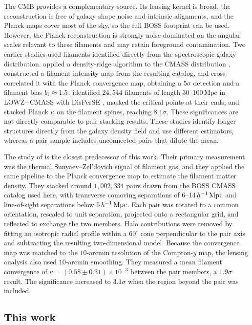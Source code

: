 The CMB provides a complementary source. Its lensing kernel is broad, the
reconstruction is free of galaxy shape noise and intrinsic alignments, and
the Planck maps cover most of the sky, so the full BOSS footprint can be
used. However, the Planck reconstruction is strongly noise dominated on the
angular scales relevant to these filaments \citep{Planck2018lensing} and may
retain foreground contamination. Two earlier studies used filaments
identified directly from the spectroscopic galaxy distribution.
\citet{He2018} applied a density-ridge algorithm to the CMASS
distribution \citep{Chen2016}, constructed a filament intensity map from the
resulting catalog, and cross-correlated it with the Planck convergence map,
obtaining a $5\sigma$ detection and a filament bias $b_{\rm f}\approx1.5$.
\citet{Tanimura2020} identified $24{,}544$ filaments of length
$30$--$100\,\mathrm{Mpc}$ in LOWZ+CMASS with DisPerSE \citep{Sousbie2011},
masked the critical points at their ends, and stacked Planck $\kappa$ on the
filament spines, reaching $8.1\sigma$. These significances are not directly
comparable to pair-stacking results. These studies identify longer structures
directly from the galaxy density field and use different estimators, whereas
a pair sample includes unconnected pairs that dilute the mean.

The study of \citet{deGraaff2019} is the closest predecessor of this work.
Their primary measurement was the thermal Sunyaev--Zel'dovich signal of
filament gas, and they applied the same pipeline to the Planck convergence
map to estimate the filament matter density. They stacked around
$1{,}002{,}334$ pairs
drawn from the BOSS CMASS catalog used here, with transverse comoving
separations of $6$--$14\,h^{-1}\,{\rm Mpc}$ and line-of-sight separations below
$5\,h^{-1}\,{\rm Mpc}$. Each pair was rotated to a common orientation, rescaled to unit
separation, projected onto a rectangular grid, and reflected to exchange the
two members. Halo contributions were removed by fitting an isotropic radial
profile within a $60^{\circ}$ cone perpendicular to the pair axis and
subtracting the resulting two-dimensional model. Because the convergence map
was matched to the $10$-arcmin resolution of the Compton-$y$ map, the
lensing analysis also used $10$-arcmin smoothing. They measured a mean
filament convergence of
$\bar{\kappa}=(0.58\pm0.31)\times10^{-3}$ between the pair members, a
$1.9\sigma$ result. The significance increased to $3.1\sigma$ when the region
beyond the pair was included.

\subsection{This work}

